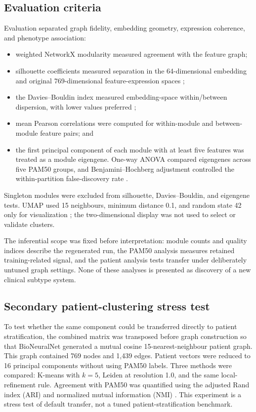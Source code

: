 \documentclass[11pt]{article}
\begin{document}
\subsection{Evaluation criteria}

Evaluation separated graph fidelity, embedding geometry, expression coherence, and phenotype association:
\begin{itemize}
    \item weighted NetworkX modularity measured agreement with the feature graph;
    \item silhouette coefficients measured separation in the 64-dimensional embedding and original 769-dimensional feature-expression spaces \cite{rousseeuw1987};
    \item the Davies--Bouldin index measured embedding-space within/between dispersion, with lower values preferred \cite{davies1979};
    \item mean Pearson correlations were computed for within-module and between-module feature pairs; and
    \item the first principal component of each module with at least five features was treated as a module eigengene. One-way ANOVA compared eigengenes across five PAM50 groups, and Benjamini--Hochberg adjustment controlled the within-partition false-discovery rate \cite{benjamini1995}.
\end{itemize}
Singleton modules were excluded from silhouette, Davies--Bouldin, and eigengene tests. UMAP used 15 neighbours, minimum distance 0.1, and random state 42 only for visualization \cite{mcinnes2018}; the two-dimensional display was not used to select or validate clusters.

The inferential scope was fixed before interpretation: module counts and quality indices describe the regenerated run, the PAM50 analysis measures retained training-related signal, and the patient analysis tests transfer under deliberately untuned graph settings. None of these analyses is presented as discovery of a new clinical subtype system.

\subsection{Secondary patient-clustering stress test}

To test whether the same component could be transferred directly to patient stratification, the combined matrix was transposed before graph construction so that BioNeuralNet generated a mutual cosine 15-nearest-neighbour patient graph. This graph contained 769 nodes and 1,439 edges. Patient vectors were reduced to 16 principal components without using PAM50 labels. Three methods were compared: K-means with $k=5$, Leiden at resolution 1.0, and the same local-refinement rule. Agreement with PAM50 was quantified using the adjusted Rand index (ARI) \cite{hubert1985} and normalized mutual information (NMI) \cite{strehl2002}. This experiment is a stress test of default transfer, not a tuned patient-stratification benchmark.
\end{document}
